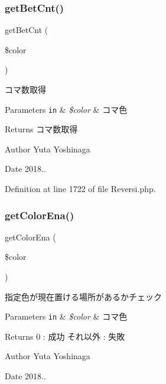 \subsubsection{\texorpdfstring{get\+Bet\+Cnt()}{getBetCnt()}}
{\footnotesize\ttfamily get\+Bet\+Cnt (\begin{DoxyParamCaption}\item[{}]{\$color }\end{DoxyParamCaption})}



コマ数取得 


\begin{DoxyParams}[1]{Parameters}
\mbox{\tt in}  & {\em \$color} & コマ色 \\
\hline
\end{DoxyParams}
\begin{DoxyReturn}{Returns}
コマ数取得 
\end{DoxyReturn}
\begin{DoxyAuthor}{Author}
Yuta Yoshinaga 
\end{DoxyAuthor}
\begin{DoxyDate}{Date}
2018.. 
\end{DoxyDate}


Definition at line 1722 of file Reversi.\+php.

\mbox{\label{class_reversi_aead5ee041feb6ac2609266614ea06f78}} 
\subsubsection{\texorpdfstring{get\+Color\+Ena()}{getColorEna()}}
{\footnotesize\ttfamily get\+Color\+Ena (\begin{DoxyParamCaption}\item[{}]{\$color }\end{DoxyParamCaption})}



指定色が現在置ける場所があるかチェック 


\begin{DoxyParams}[1]{Parameters}
\mbox{\tt in}  & {\em \$color} & コマ色 \\
\hline
\end{DoxyParams}
\begin{DoxyReturn}{Returns}
0 \+: 成功 それ以外 \+: 失敗 
\end{DoxyReturn}
\begin{DoxyAuthor}{Author}
Yuta Yoshinaga 
\end{DoxyAuthor}
\begin{DoxyDate}{Date}
2018.. 
\end{DoxyDate}


